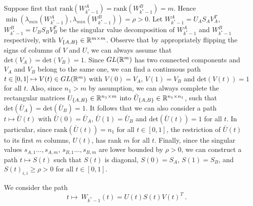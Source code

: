 Suppose first that $\text{rank}(W_{k^*-1}^A) = \text{rank}(W_{k^*-1}^B) =m$. Hence $\min( \lambda_{min}(W_{k^*-1}^A),\lambda_{min}(W_{k^*-1}^B)) = \rho > 0 $.
Let $W_{k^*-1}^A = U_A S_A V_A^T$,  $W_{k^*-1}^B = U_B S_B V_B^T$ be the singular value decomposition of 
$W_{k^*-1}^A$ and $W_{k^*-1}^B$ respectively, with $V_{\{A,B\}} \in {\mathbb{R}}^{m \times m}$. Observe that by appropriately 
flipping the signs of columns of $V$ and $U$, we can always assume that $\text{det}(V_A) = \text{det}(V_B) =1$. 
Since $GL({\mathbb{R}}^m)$ has two connected components and $V_A$ and $V_B$ belong to the same one, we can find 
a continuous path $t\in [0,1] \mapsto V(t) \in GL({\mathbb{R}}^m)$ with $V(0) = V_A$, $V(1) = V_B$ and $\text{det}(V(t)) = 1$ for all $t$. 
Also, since $n_1 > m$ by assumption, we can always complete the rectangular matrices $U_{\{A,B\}} \in {\mathbb{R}}^{n_1 \times m}$ into
$\bar{U}_{\{A,B\}} \in {\mathbb{R}}^{n_1 \times n_1}$, such that $\text{det}(\bar{U}_A) = \text{det}(\bar{U}_B) = 1$. It follows that we can also 
consider a path $t \mapsto \bar{U}(t)$ with $\bar{U}(0) = \bar{U}_A$, $\bar{U}(1) = \bar{U}_B$ and $\text{det}(\bar{U}(t)) = 1$ for all $t$. 
In particular, since $\text{rank}(\bar{U}(t)) = n_1$ for all $t\in[0,1]$, the restriction of $\bar{U}(t)$ to its first $m$ columns, $U(t)$, has rank $m$ for all $t$. 
Finally, since the singular values $s_{A,1} \dots, s_{A,m}$, $s_{B,1} \dots, s_{B,m}$ are lower bounded by $\rho > 0$, 
we can construct a path $t \mapsto S(t)$ such that $S(t)$ is diagonal, $S(0) = S_A$, $S(1) = S_B$, and $S(t)_{i,i} \geq \rho >0$ for all $t \in [0,1]$.

We consider the path 
\begin{equation}
t \mapsto~W_{k^*-1}(t) = U(t) S(t) V(t)^T~.
\end{equation}



